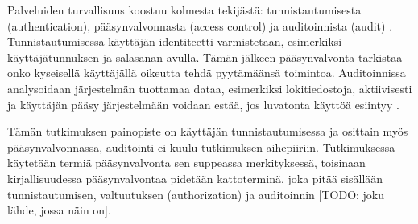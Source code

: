Palveluiden turvallisuus koostuu kolmesta tekijästä: tunnistautumisesta (authentication), pääsynvalvonnasta (access control) ja auditoinnista (audit) \cite{sandhu}. Tunnistautumisessa käyttäjän identiteetti varmistetaan, esimerkiksi käyttäjätunnuksen ja salasanan avulla. Tämän jälkeen pääsynvalvonta tarkistaa onko kyseisellä käyttäjällä oikeutta tehdä pyytämäänsä toimintoa. Auditoinnissa analysoidaan järjestelmän tuottamaa dataa, esimerkiksi lokitiedostoja, aktiivisesti ja käyttäjän pääsy järjestelmään voidaan estää, jos luvatonta käyttöä esiintyy \cite{sandhu}.

Tämän tutkimuksen painopiste on käyttäjän tunnistautumisessa ja osittain myös pääsynvalvonnassa, auditointi ei kuulu tutkimuksen aihepiiriin. Tutkimuksessa käytetään termiä pääsynvalvonta sen suppeassa merkityksessä, toisinaan kirjallisuudessa pääsynvalvontaa pidetään kattoterminä, joka pitää sisällään tunnistautumisen, valtuutuksen (authorization) ja auditoinnin [TODO: joku lähde, jossa näin on].
